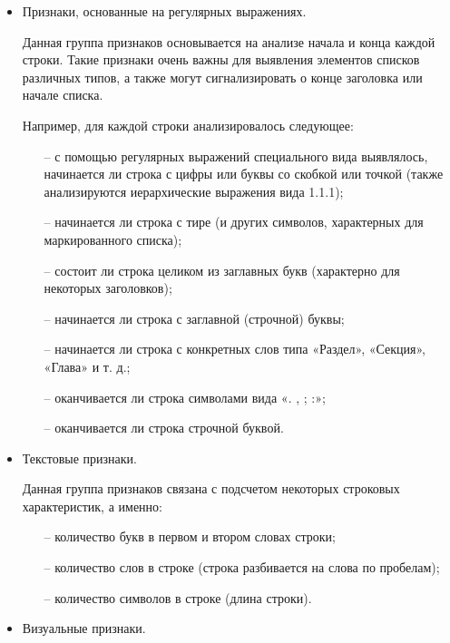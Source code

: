 \documentclass[a4paper,12pt]{article}
\begin{document}
\begin{itemize}

	\item Признаки, основанные на регулярных выражениях.

	Данная группа признаков основывается на анализе начала и конца каждой строки. Такие признаки очень важны для выявления элементов списков различных типов, а также могут сигнализировать о конце заголовка или начале списка.

	Например, для каждой строки анализировалось следующее:

	\begin{itemize}

		\item[--] с помощью регулярных выражений специального вида выявлялось, начинается ли строка с цифры или буквы со скобкой или точкой (также анализируются иерархические выражения вида 1.1.1);
		\item[--] начинается ли строка с тире (и других символов, характерных для маркированного списка);
		\item[--] состоит ли строка целиком из заглавных букв (характерно для некоторых заголовков);
		\item[--] начинается ли строка с заглавной (строчной) буквы;
		\item[--] начинается ли строка с конкретных слов типа «Раздел», «Секция», «Глава» и т. д.;
		\item[--] оканчивается ли строка символами вида «. , ; :»;
		\item[--] оканчивается ли строка строчной буквой.

	\end{itemize}

	\item Текстовые признаки.

	Данная группа признаков связана с подсчетом некоторых строковых характеристик, а именно:

	\begin{itemize}

		\item[--] количество букв в первом и втором словах строки;
		\item[--] количество слов в строке (строка разбивается на слова по пробелам);
		\item[--] количество символов в строке (длина строки).

	\end{itemize}

	\item Визуальные признаки.


\end{itemize}
\end{document}
